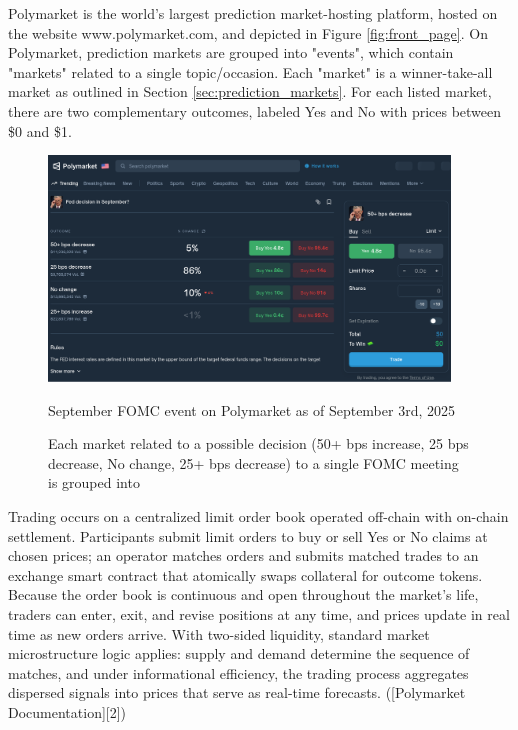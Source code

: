
Polymarket is the world's largest prediction market-hosting platform, %
hosted on the website www.polymarket.com, and depicted in Figure \ref{fig:front_page}.
On Polymarket, prediction markets are grouped into "events", which contain "markets" related to a single topic/occasion.
Each "market" is a winner-take-all market as outlined in Section \ref{sec:prediction_markets}. For each listed market, there are two complementary outcomes, labeled Yes and No with prices between \$0 and \$1.


\begin{figure}[H]
  \begin{center}
    \includegraphics[width=0.95\textwidth]{figures/FOMC_event_September.png}
  \end{center}
  \caption{September FOMC event on Polymarket as of September 3rd, 2025}
  \caption*{Each market related to a possible decision (50+ bps increase, 25 bps decrease, No change, 25+ bps decrease) to a single FOMC meeting is grouped into}
\end{figure}




Trading occurs on a centralized limit order book operated off-chain with on-chain settlement. Participants submit limit orders to buy or sell Yes or No claims at chosen prices; an operator matches orders and submits matched trades to an exchange smart contract that atomically swaps collateral for outcome tokens. Because the order book is continuous and open throughout the market’s life, traders can enter, exit, and revise positions at any time, and prices update in real time as new orders arrive. With two-sided liquidity, standard market microstructure logic applies: supply and demand determine the sequence of matches, and under informational efficiency, the trading process aggregates dispersed signals into prices that serve as real-time forecasts. ([Polymarket Documentation][2])

